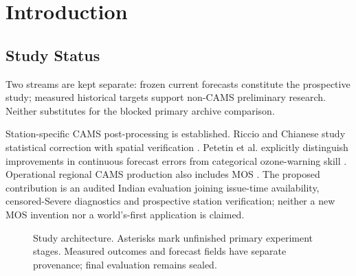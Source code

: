 \section{Introduction}
\subsection{Study Status}
Two streams are kept separate: frozen current forecasts constitute the
prospective study; measured historical targets support non-CAMS preliminary
research. Neither substitutes for the blocked primary archive comparison.








Station-specific CAMS post-processing is established. Riccio and Chianese
study statistical correction with spatial verification \cite{riccio2024mos}.
Petetin et al. explicitly distinguish improvements in continuous forecast
errors from categorical ozone-warning skill \cite{petetin2022mos}.
Operational regional CAMS production also includes MOS \cite{colette2025cams}.
The proposed contribution is an audited Indian evaluation joining issue-time
availability, censored-Severe diagnostics and prospective station verification;
neither a new MOS invention nor a world's-first application is claimed.
\begin{figure}[h]\centering
{}
\caption{Study architecture. Asterisks mark unfinished primary experiment stages. Measured outcomes and forecast fields have separate provenance; final evaluation remains sealed.}
\end{figure}
